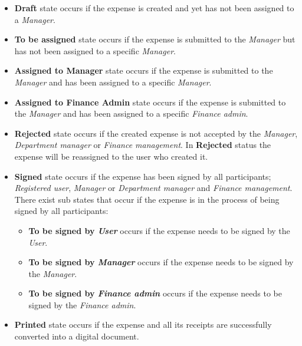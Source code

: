 \begin{itemize}
    \item \textbf{Draft} state occurs if the expense is created and yet has not been assigned to a \textit{Manager}.
    
    \item \textbf{To be assigned} state occurs if the expense is submitted to the \textit{Manager} but has not been assigned to a specific \textit{Manager}.
    
    \item \textbf{Assigned to Manager} state occurs if the expense is submitted to the \textit{Manager} and has been assigned to a specific \textit{Manager}.
    
    \item \textbf{Assigned to Finance Admin} state occurs if the expense is submitted to the \textit{Manager} and has been assigned to a specific \textit{Finance admin}.
    
    \item \textbf{Rejected} state occurs if the created expense is not accepted by the \textit{Manager}, \textit{Department manager} or \textit{Finance management}. In \textbf{Rejected} status the expense will be reassigned to the user who created it.
    
    \item \textbf{Signed} state occurs if the expense has been signed by all participants; \textit{Registered user}, \textit{Manager} or \textit{Department manager} and \textit{Finance management}. There exist sub states that occur if the expense is in the process of being signed by all participants:
        \begin{itemize}
            \item \textbf{To be signed by \textit{User}} occurs if the expense needs to be signed by the \textit{User}.
            \item \textbf{To be signed by \textit{Manager}} occurs if the expense needs to be signed by the \textit{Manager}.
            \item \textbf{To be signed by \textit{Finance admin}} occurs if the expense needs to be signed by the \textit{Finance admin}.
        \end{itemize}
    
    \item \textbf{Printed} state occurs if the expense and all its receipts are successfully converted into a digital document.
    
\end{itemize}


